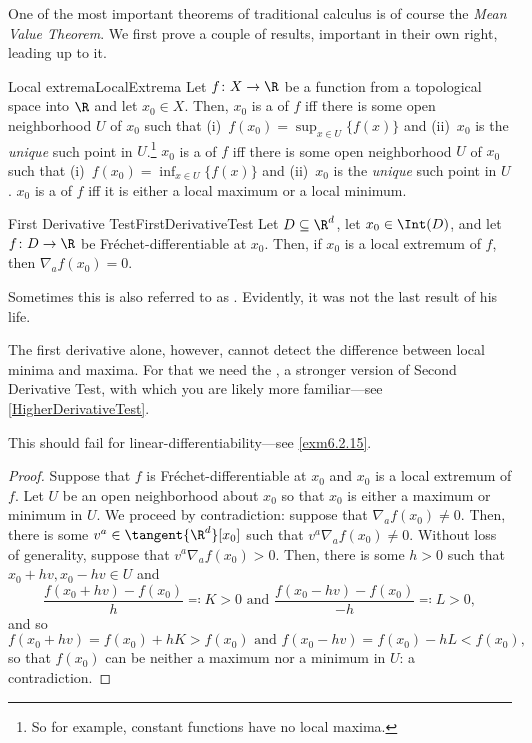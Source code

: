 One of the most important theorems of traditional calculus is of course the \emph{Mean Value Theorem}.  We first prove a couple of results, important in their own right, leading up to it.
\begin{dfn}{Local extrema}{LocalExtrema}
Let $f\colon X\rightarrow \R$ be a function from a topological space into $\R$ and let $x_0\in X$.  Then, $x_0$ is a  of $f$ iff there is some open neighborhood $U$ of $x_0$ such that (i)~$f(x_0)=\sup _{x\in U}\{ f(x)\}$ and (ii)~$x_0$ is the \emph{unique} such point in $U$.\footnote{So for example, constant functions have no local maxima.}  $x_0$ is a  of $f$ iff there is some open neighborhood $U$ of $x_0$ such that (i)~$f(x_0)=\inf _{x\in U}\{ f(x)\}$ and (ii)~$x_0$ is the \emph{unique} such point in $U$.  $x_0$ is a  of $f$ iff it is either a local maximum or a local minimum.
\end{dfn}
\begin{prp}{First Derivative Test}{FirstDerivativeTest}
Let $D\subseteq \R ^d$, let $x_0\in \Int (D)$, and let $f\colon D\rightarrow \R$ be Fréchet-differentiable at $x_0$.  Then, if $x_0$ is a local extremum of $f$, then $\nabla _af(x_0)=0$.
\begin{rmk}
Sometimes this is also referred to as .  Evidently, it was not the last result of his life.
\end{rmk}
\begin{rmk}
The first derivative alone, however, cannot detect the difference between local minima and maxima.  For that we need the \emph{}, a stronger version of Second Derivative Test, with which you are likely more familiar---see \cref{HigherDerivativeTest}.
\end{rmk}
\begin{wrn}
	This should fail for linear-differentiability---see \cref{exm6.2.15}.
\end{wrn}
\begin{proof}
Suppose that $f$ is Fréchet-differentiable at $x_0$ and $x_0$ is a local extremum of $f$.  Let $U$ be an open neighborhood about $x_0$ so that $x_0$ is either a maximum or minimum in $U$.  We proceed by contradiction:  suppose that $\nabla _af(x_0)\neq 0$.  Then, there is some $v^a\in \tangent{\R ^d}[x_0]$ such that $v^a\nabla _af(x_0)\neq 0$.  Without loss of generality, suppose that $v^a\nabla _af(x_0)>0$.  Then, there is some $h>0$ such that $x_0+hv,x_0-hv\in U$ and
{\scriptsize
\begin{equation}
\frac{f(x_0+hv)-f(x_0)}{h}\eqqcolon K>0\text{ and }\frac{f(x_0-hv)-f(x_0)}{-h}\eqqcolon L>0,
\end{equation}
}
and so
{\scriptsize
\begin{equation}
f(x_0+hv)=f(x_0)+hK>f(x_0)\text{ and }f(x_0-hv)=f(x_0)-hL<f(x_0),
\end{equation}
}
so that $f(x_0)$ can be neither a maximum nor a minimum in $U$:  a contradiction.
\end{proof}
\end{prp}
